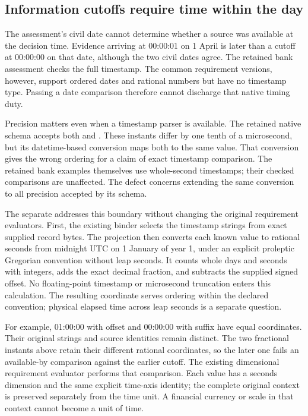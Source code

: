\subsection{Information cutoffs require time within the day}
\label{sec:exact-information-time}

The assessment's civil date cannot determine whether a source was available
at the decision time. Evidence arriving at 00:00:01 on 1 April is later than a
cutoff at 00:00:00 on that date, although the two civil dates agree. The retained
bank assessment checks the full timestamp. The common requirement versions,
however, support ordered dates and rational numbers but have no timestamp type.
Passing a date comparison therefore cannot discharge that native timing duty.

Precision matters even when a timestamp parser is available. The retained native
schema accepts both  and
. These instants differ by one tenth of a
microsecond, but its datetime-based conversion maps both to the same value.
That conversion gives the wrong ordering for a claim of exact timestamp
comparison. The retained bank examples themselves use whole-second timestamps;
their checked comparisons are unaffected. The defect concerns extending the
same conversion to all precision accepted by its schema.

The separate  addresses this boundary without
changing the original requirement evaluators. First, the existing binder selects
the timestamp strings from exact supplied record bytes. The projection then
converts each known value to rational seconds from midnight UTC on 1 January
of year 1, under an explicit proleptic Gregorian convention without leap seconds.
It counts whole days and seconds with integers, adds the exact decimal fraction,
and subtracts the supplied signed offset. No floating-point timestamp or
microsecond truncation enters this calculation. The resulting coordinate serves
ordering within the declared convention; physical elapsed time across leap
seconds is a separate question.

For example, 01:00:00 with offset  and 00:00:00 with suffix
 have equal coordinates. Their original strings and source identities
remain distinct. The two fractional instants above retain their different
rational coordinates, so the later one fails an available-by comparison against
the earlier cutoff. The existing dimensional requirement evaluator performs
that comparison. Each value has a seconds dimension and the same explicit
time-axis identity; the complete original context is preserved separately from
the time unit. A financial currency or scale in that context cannot become a
unit of time.

